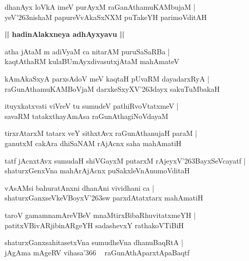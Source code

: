 \documentclass[twoside,12pt,openright]{book}
\def\S{\char'263}
\newcounter{shloka}[chapter]
\def\uvaca#1{\centerline{{\large\textbf{#1}}}}
\begin{document}
\begin{shloka}%
dhanAyx loVkA imeV purAyxM raGanAthamuKAMbujaM |\\
yeV\S nishaM papureVvAkaSxNXM puTakeYH parimoVditAH 
\end{shloka}

\uvaca{|| hadinAlakxneya adhAyxyavu ||}

\begin{shloka}%
atha jAtaM m adiVyaM ca nitarAM puruSaSaRBa |\\
kaqtAthaRM kulaBUmAyxdivasutxjAtaM mahAmateV 
\end{shloka}

\begin{shloka}%
kAmAkaSxyA parxsAdoV meV kaqtaH pUvaRM dayadarxRyA |\\
raGunAthamuKAMBoVjaM darxkeSxyXV\S dayx sakuTuMbakaH 
\end{shloka}

\begin{shloka}%
ituyxkatxvati viVreV tu sumudeV pathiRvoVtatxmeV |\\
savaRM tatakxthayAmAsa raGunAthagiNoVdayaM 
\end{shloka}

\begin{shloka}%
tirxrAtarxM tatarx veY sithxtAvx raGunAthanujaH paraM |\\
ganutxM cakAra dhiSaNAM rAjAcnx saha mahAmatiH
\end{shloka}

\begin{shloka}%
tatf jAcnxtAvx sumudaH shiVGayxM putarxM rAjeyxV\S BayxSeVcayatf |\\
shaturxGenxVna mahArAjAcnx puSakxleVnAnumoVditaH 
\end{shloka}

\begin{shloka}%
vAsAMsi bahuratAnxni dhanAni vividhani ca |\\
shaturxGanxseVkeVBoyxV\S sw parxdAtatxtarx mahAmatiH 
\end{shloka}

\begin{shloka}%
taroV gamamnamAreVBeV mnaMtirxBibaRhuvitatxmeYH |\\
patitxVBivARjibinARgeYH sadashevxY rathakoVTiBiH 
\end{shloka}

\begin{shloka}%
shaturxGanxsahitasetxVna sumudheVna dhanuBaqRtA |\\
jAgAma mAgeRV vihasa\char'366 ~ raGunAthAparxtApaBaqtf 
\end{shloka}
\end{document}
